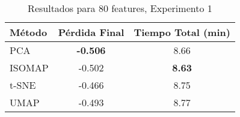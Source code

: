 
\begin{table}[h]
\centering
\begin{tabular}{lcc}
\toprule
\textbf{Método} & \textbf{Pérdida Final} & \textbf{Tiempo Total (min)} \\
\midrule
PCA & \textbf{-0.506} & 8.66 \\
ISOMAP & -0.502 & \textbf{8.63} \\
t-SNE & -0.466 & 8.75 \\
UMAP & -0.493 & 8.77 \\
\bottomrule
\end{tabular}
\caption{Resultados para 80 features, Experimento 1}
\label{tab:results_80feat_exp1}
\end{table}
